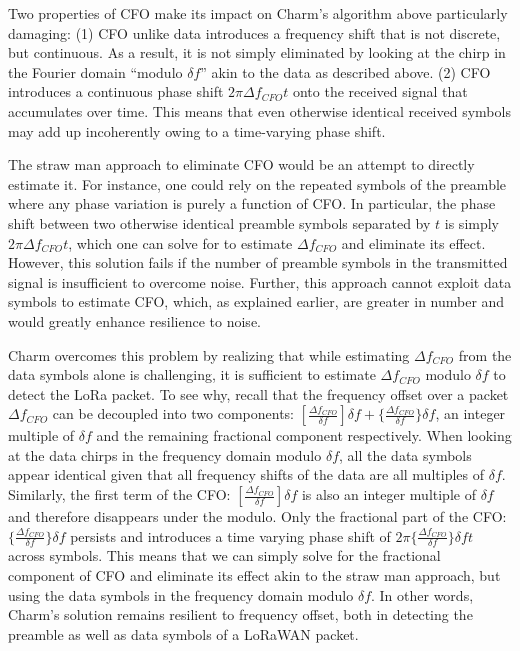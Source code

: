 Two properties of CFO make its impact on Charm's algorithm above particularly
damaging: (1) CFO unlike data introduces a frequency shift that is not
discrete, but continuous. As a result, it is not simply eliminated by looking at
the chirp in the Fourier domain ``modulo $\delta f$''  akin to the data as
described above. (2) CFO introduces a continuous phase shift $2 \pi
\Delta f_{CFO} t$ onto the received signal that accumulates over time. This
means that even otherwise identical received symbols may add up incoherently
owing to a time-varying phase shift.

The straw man approach to eliminate CFO would be an attempt to directly
estimate it. For instance, one could rely on the repeated symbols of the
preamble where any phase variation is purely a function of CFO. In particular,
the phase shift between two otherwise identical preamble symbols separated by
$t$ is simply $2 \pi \Delta f_{CFO} t$, which one can solve for to estimate $\Delta
f_{CFO}$ and eliminate its effect. However, this solution fails if the number of preamble symbols in the transmitted signal is insufficient to overcome noise. Further, this approach cannot exploit data symbols to estimate CFO, which, as explained earlier, are greater in number and would greatly enhance resilience to noise.

Charm overcomes this problem by realizing that while estimating $\Delta
f_{CFO}$ from the data symbols alone is challenging, it is sufficient to
estimate $\Delta f_{CFO}$ modulo $\delta f$ to detect the LoRa packet. To see
why, recall that the frequency offset over a packet $\Delta f_{CFO}$ can be
decoupled into two components: $[\frac{\Delta f_{CFO}}{\delta f}]\delta f + \{\frac{\Delta f_{CFO}}{\delta f}\}\delta f$, an
integer multiple of $\delta f$ and the remaining fractional component
respectively. When looking at the data chirps in the frequency domain modulo
$\delta f$, all the data symbols appear identical given that all frequency
shifts of the data are all multiples of $\delta f$. Similarly, the first term of the CFO:
$[\frac{\Delta f_{CFO}}{\delta f}]\delta f$ is also an integer multiple of $\delta f$ and therefore disappears under the modulo. Only the fractional part of the CFO: $\{\frac{\Delta f_{CFO}}{\delta f}\}\delta f$ persists
and introduces a time varying phase shift of $2 \pi \{\frac{\Delta f_{CFO}}{\delta f}\}\delta f t$
across symbols. This means that we can simply solve for the fractional component of CFO and eliminate its effect akin to the straw man approach, but using the data
symbols in the frequency domain modulo $\delta f$. In other words, Charm's
solution remains resilient to frequency offset, both in detecting the preamble
as well as data symbols of a LoRaWAN packet.

